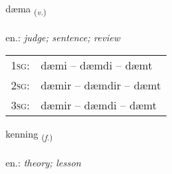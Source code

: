 \documentclass[frontgrid, backgrid]{flacards}\usepackage[]{graphicx}\usepackage[]{xcolor}
\begin{document}
\renewcommand{\flhead}{\vskip5pt \fboxsep=0pt {\small\bfseries\footnotesize Sagnorð | Verb}}
\renewcommand{\fcfoot}{\vskip5pt \fboxsep=0pt \hspace{2pt}{\small\bfseries\footnotesize 1K}}

\renewcommand{\blhead}{\vskip5pt {\small\bfseries\footnotesize Sagnorð | Verb }}
\renewcommand{\bcfoot}{\vskip5pt \hspace{2pt}{\small\bfseries\footnotesize 1K}}


{dæma \small{\textsubscript{(\textit{v.})}} \\[1ex] %
\textphonetic{[taiːma]} \\
en.: \emph{judge; sentence; review} \\  [2ex]
\renewcommand*{\arraystretch}{0.8}
\begin{tabular}{p{1cm}l}
\textsc{1sg}: & dæmi -- dæmdi -- dæmt \\ 
\textsc{2sg}: & dæmir -- dæmdir -- dæmt \\ 
\textsc{3sg}: & dæmir -- dæmdi -- dæmt \\ 
\end{tabular}
}

\renewcommand{\flhead}{\vskip5pt \fboxsep=0pt {\small\bfseries\footnotesize Nafnorð | Noun}}
\renewcommand{\fcfoot}{\vskip5pt \fboxsep=0pt \hspace{2pt}{\small\bfseries\footnotesize 1K}}

\renewcommand{\blhead}{\vskip5pt {\small\bfseries\footnotesize Nafnorð | Noun }}
\renewcommand{\bcfoot}{\vskip5pt \hspace{2pt}{\small\bfseries\footnotesize 1K}}


{kenning \small{\textsubscript{(\textit{f.})}} \\[1ex] %
\textphonetic{[cʰɛniŋk]} \\
en.: \emph{theory; lesson} \\  [2ex]
\renewcommand*{\arraystretch}{0.8}
}
\end{document}
